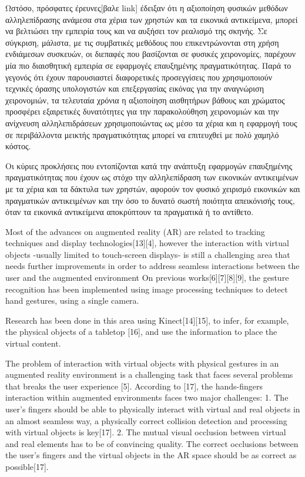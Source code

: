 Ωστόσο, πρόσφατες έρευνες[βαλε link] έδειξαν ότι η αξιοποίηση φυσικών μεθόδων αλληλεπίδρασης ανάμεσα στα χέρια των χρηστών και τα εικονικά αντικείμενα, μπορεί να βελτιώσει την εμπειρία τους και να αυξήσει τον ρεαλισμό της σκηνής.  Σε σύγκριση, μάλιστα, με τις συμβατικές μεθόδους που επικεντρώνονται στη χρήση ενδιάμεσων συσκευών, οι διεπαφές που βασίζονται σε φυσικές χειρονομίες, παρέχουν μία πιο διαισθητική εμπειρία σε εφαρμογές επαυξημένης πραγματικότητας. Παρά το γεγονός ότι έχουν παρουσιαστεί διαφορετικές προσεγγίσεις που χρησιμοποιούν τεχνικές όρασης υπολογιστών και επεξεργασίας εικόνας για την αναγνώριση χειρονομιών, τα τελευταία χρόνια η αξιοποίηση αισθητήρων βάθους και χρώματος προσφέρει εξαιρετικές δυνατότητες για την παρακολούθηση χειρονομιών και την ανίχνευση αλληλεπιδράσεων χρησιμοποιώντας ως μέσο τα χέρια και η εφαρμογή τους σε περιβάλλοντα μεικτής πραγματικότητας μπορεί να επιτευχθεί με πολύ χαμηλό κόστος.

Οι κύριες προκλήσεις που εντοπίζονται κατά την ανάπτυξη εφαρμογών επαυξημένης πραγματικότητας που έχουν ως στόχο την αλληλεπίδραση των εικονικών αντικειμένων με τα χέρια και τα δάκτυλα των χρηστών, αφορούν τον φυσικό χειρισμό εικονικών και πραγματικών αντικειμένων και την όσο το δυνατό σωστή ποιότητα απεικόνισής τους, όταν τα εικονικά αντικείμενα αποκρύπτουν τα πραγματικά ή το αντίθετο.

Most of the advances on augmented reality (AR) are related to tracking techniques and display technologies[13][4], however the interaction with virtual objects -usually limited to touch-screen displays- is still a challenging area that needs further improvements in order to address seamless interactions between the user and the augmented environment On previous works[6][7][8][9], the gesture recognition has been implemented using image processing techniques to detect hand gestures, using a single camera. 

Research has been done in this area using Kinect[14][15], to infer, for example, the physical objects of a tabletop [16], and use the information to place the virtual content. 

The problem of interaction with virtual objects with physical gestures in an augmented reality environment is a challenging task that faces several problems that breaks the user experience [5]. According to [17], the hands-fingers interaction within augmented environments faces two major challenges: 1. The user’s fingers should be able to physically interact with virtual and real objects in an almost seamless way, a physically correct collision detection and processing with virtual objects is key[17]. 2. The mutual visual occlusion between virtual and real elements has to be of convincing quality. The correct occlusions between the user’s fingers and the virtual objects in the AR space should be as correct as possible[17].



